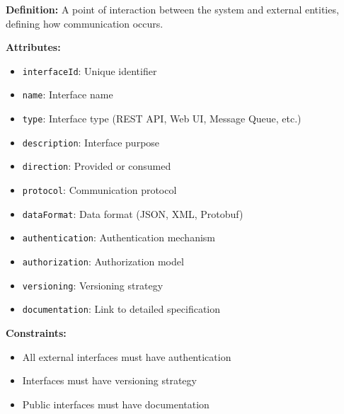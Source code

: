 \documentclass[11pt,letterpaper]{article}
\begin{document}
\begin{definitionbox}
\textbf{Definition:} A point of interaction between the system and external entities, defining how communication occurs.

\textbf{Attributes:}
\begin{itemize}[nosep]
    \item \texttt{interfaceId}: Unique identifier
    \item \texttt{name}: Interface name
    \item \texttt{type}: Interface type (REST API, Web UI, Message Queue, etc.)
    \item \texttt{description}: Interface purpose
    \item \texttt{direction}: Provided or consumed
    \item \texttt{protocol}: Communication protocol
    \item \texttt{dataFormat}: Data format (JSON, XML, Protobuf)
    \item \texttt{authentication}: Authentication mechanism
    \item \texttt{authorization}: Authorization model
    \item \texttt{versioning}: Versioning strategy
    \item \texttt{documentation}: Link to detailed specification
\end{itemize}

\textbf{Constraints:}
\begin{itemize}[nosep]
    \item All external interfaces must have authentication
    \item Interfaces must have versioning strategy
    \item Public interfaces must have documentation
\end{itemize}
\end{definitionbox}
\end{document}
